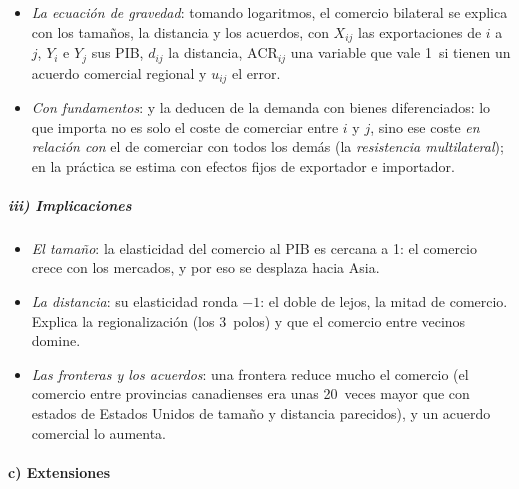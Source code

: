 \documentclass[11pt]{article}
\begin{document}
\begin{itemize}
\item \emph{La ecuación de gravedad}: tomando logaritmos, el comercio bilateral se explica con los tamaños, la distancia y los acuerdos,
  con $X_{ij}$ las exportaciones de $i$ a $j$, $Y_i$ e $Y_j$ sus PIB, $d_{ij}$ la distancia, $\mathrm{ACR}_{ij}$ una variable que vale 1~si tienen un acuerdo comercial regional y $u_{ij}$ el error.
\item \emph{Con fundamentos}: \textcite{Anderson1979Theoretical} y \textcite{AndersonvanWincoop2003Gravity} la deducen de la demanda con bienes diferenciados: lo que importa no es solo el coste de comerciar entre $i$ y $j$, sino ese coste \emph{en relación con} el de comerciar con todos los demás (la \emph{resistencia multilateral}); en la práctica se estima con efectos fijos de exportador e importador.
\end{itemize}

\subparagraph{iii) Implicaciones}

\begin{itemize}
\item \emph{El tamaño}: la elasticidad del comercio al PIB es cercana a 1: el comercio crece con los mercados, y por eso se desplaza hacia Asia.
\item \emph{La distancia}: su elasticidad ronda $-1$: el doble de lejos, la mitad de comercio\nocite{HeadMayer2014Gravity}. Explica la regionalización (los 3~polos) y que el comercio entre vecinos domine.
\item \emph{Las fronteras y los acuerdos}: una frontera reduce mucho el comercio (el comercio entre provincias canadienses era unas 20~veces mayor que con estados de Estados Unidos de tamaño y distancia parecidos), y un acuerdo comercial lo aumenta\nocite{McCallum1995National}.
\end{itemize}

\paragraph{c) Extensiones}
\end{document}
